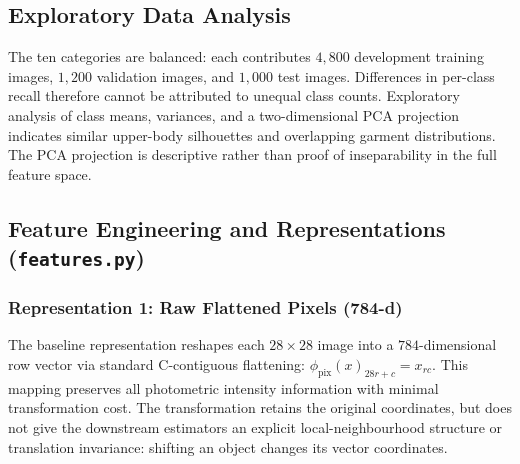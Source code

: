\documentclass[conference]{IEEEtran}
\newcommand{\file}[1]{\texttt{#1}}
\begin{document}
\subsection{Exploratory Data Analysis}
The ten categories are balanced: each contributes $4{,}800$ development
training images, $1{,}200$ validation images, and $1{,}000$ test images.
Differences in per-class recall therefore cannot
be attributed to unequal class counts. Exploratory analysis of class
means, variances, and a two-dimensional PCA projection indicates similar
upper-body silhouettes and overlapping garment distributions. The PCA
projection is descriptive rather than proof of inseparability in the
full feature space.

\subsection{Feature Engineering and Representations (\file{features.py})}

\subsubsection{Representation 1: Raw Flattened Pixels (784-d)}
The baseline representation reshapes each $28\times 28$ image into a
$784$-dimensional row vector via standard C-contiguous flattening:
$\phi_{\text{pix}}(x)_{28r + c} = x_{rc}$. This mapping preserves all
photometric intensity information with minimal transformation cost.
The transformation retains the original coordinates, but does not give
the downstream estimators an explicit local-neighbourhood structure or
translation invariance: shifting an object changes its vector coordinates.
\end{document}
